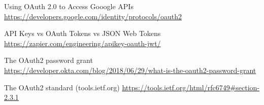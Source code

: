\documentclass[11pt]{style}
\begin{document}
\begin{thebibliography}{9}
    Using OAuth 2.0 to Access Gooogle APIs
    \\
    \url{https://developers.google.com/identity/protocols/oauth2}

    API Keys vs OAuth Tokens vs JSON Web Tokens
    \\
    \url{https://zapier.com/engineering/apikey-oauth-jwt/}

    The OAuth2 password grant
    \\
    \url{https://developer.okta.com/blog/2018/06/29/what-is-the-oauth2-password-grant}

    The OAuth2 standard (tools.ietf.org)
    \url{https://tools.ietf.org/html/rfc6749#section-2.3.1}
\end{thebibliography}

\newpage
\end{document}
